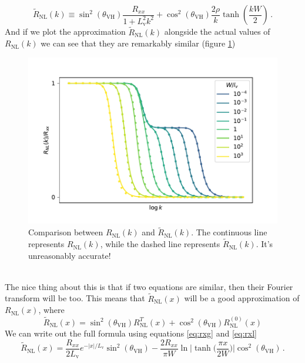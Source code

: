 \begin{equation}
    \tilde R_{\textrm{NL}}(k)\equiv
    \sin^2(\theta_{\textrm{VH}})\frac {R_{xx}}{1+L_\textrm{v}^2k^2}+
    \cos^2(\theta_{\textrm{VH}})\frac {2\rho}{k}\tanh\left(\frac{kW}2\right)\,.
\end{equation}
And if we plot the approximation $\tilde R_{\textrm{NL}}(k)$ alongside the actual values of $R_{\textrm{NL}}(k)$ we can see that they are remarkably similar (figure \ref{fig:kapproxcomp})
\begin{figure}[h!]
    \centering
    \includegraphics[width=\linewidth]{Immagini/rnl/kapproxcomp.pdf}
    \caption{Comparison between $R_{\textrm{NL}}(k)$ and $\tilde R_{\textrm{NL}}(k)$. The continuous line represents $R_{\textrm{NL}}(k)$, while the dashed line represents $\tilde R_{\textrm{NL}}(k)$. It's unreasonably accurate!}
    \label{fig:kapproxcomp}
\end{figure}\\
The nice thing about this is that if two equations are similar, then their Fourier transform will be too.
This means that $\tilde R_{\textrm{NL}}(x)$ will be a good approximation of $R_{\textrm{NL}}(x)$, where
\begin{equation}
    \boxed{
        \tilde R_{\textrm{NL}}(x)=
        \sin^2(\theta_{\textrm{VH}})R_{\textrm{NL}}^T(x)+
        \cos^2(\theta_{\textrm{VH}})R_{\textrm{NL}}^{(0)}(x)
    }
    \label{eq:rnl}
\end{equation}
We can write out the full formula using equations \ref{eq:rxg} and \ref{eq:rxl}
\begin{equation}
    \tilde R_{\textrm{NL}}(x)=
    \frac{R_{xx}}{2L_\textrm{v}}e^{-|x|/L_\textrm{v}}\sin^2(\theta_{\textrm{VH}})-
    \frac{2R_{xx}}{\pi W}\ln \bigg|\tanh \Big(\frac{\pi x}{2W}\Big)\bigg|\cos^2(\theta_{\textrm{VH}})\,.
\end{equation}
